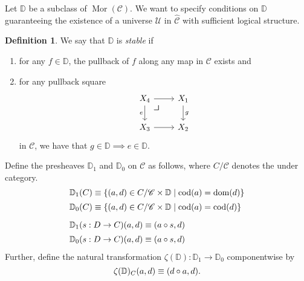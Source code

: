 \documentclass[10pt,letterpaper,cm]{nupset}
\theoremstyle{definition}
\newtheorem{definition}{Definition}[subsection]
\theoremstyle{theorem}
\theoremstyle{remark}
\DeclareMathOperator{\mor}{Mor}
\newcommand{\0}{\mathbf{0}}
\newcommand{\1}{\mathbf{1}}
\newcommand{\2}{\mathbf{2}}
\renewcommand{\c}{\mathscr{C}}
\DeclareMathOperator{\dom}{dom}
\DeclareMathOperator{\cod}{cod}
\newcommand{\be}{\begin{enumerate}}
\newcommand{\ee}{\end{enumerate}}
\begin{document}
Let $\mathbb{D}$ be a subclass of $\mor(\c)$. We want to specify conditions on $\mathbb{D}$ guaranteeing the existence of a universe $\mathcal{U}$ in $\widehat{\c}$ with sufficient logical structure. 

\begin{definition} We say that $\mathbb{D}$ is \textit{stable} if
\be[label=(\alph*)]
\item for any $f\in \mathbb{D}$, the pullback of $f$ along any map in $\c$ exists and 
\item for any pullback square
\[
\begin{tikzcd}
X_4 \arrow[r] \arrow[d, "e"']  \arrow[dr, phantom, "\scalebox{1.5}{\color{black}$\lrcorner$}" , very near start, color=black] & X_1 \arrow[d, "g"] \\
X_3 \arrow[r]                 & X_2               
\end{tikzcd}
\] in $\c$, we have that $g\in \mathbb{D} \implies e\in \mathbb{D}$.
\ee
\end{definition}

Define the presheaves $\mathbb{D}_1$ and $\mathbb{D}_0$ on $\c$ as follows, where $C/\c$ denotes the under category.
\begin{align*}
& \mathbb{D}_1(C)  \equiv \mleft\{\mleft(a,d\mright) \in C/\c \times \mathbb{D} \mid \cod(a) = \dom(d)\mright\}
\\[2pt] &\mathbb{D}_0(C)  \equiv \mleft\{\mleft(a,d\mright) \in C/\c  \times \mathbb{D} \mid \cod(a) = \cod(d)\mright\} 
\\[6pt]  & \mathbb{D}_1(s: D \to C)(a,d)  \equiv \mleft(a \circ s, d\mright) 
\\[2pt]   &\mathbb{D}_0(s: D \to C)(a,d)  \equiv \mleft(a \circ s, d\mright) 
\end{align*}
Further, define the natural transformation $\zeta(\mathbb{D}) :\mathbb{D}_1 \to \mathbb{D}_0$ componentwise by
\[
\zeta(\mathbb{D})_C(a,d) \equiv \mleft(d \circ a, d\mright).
\] 
\end{document}
